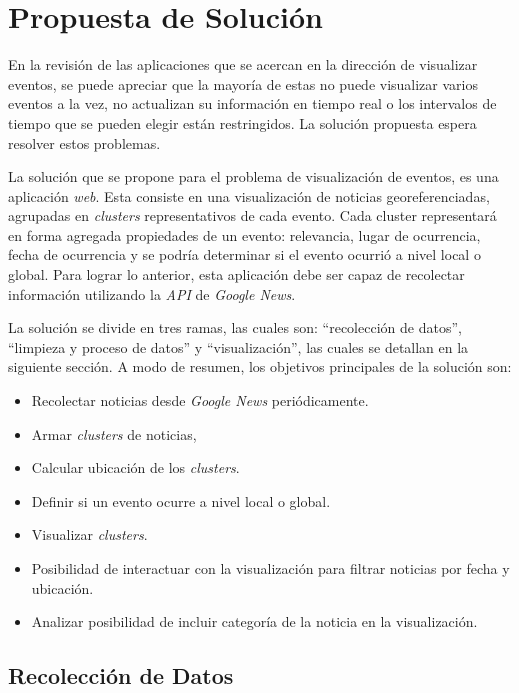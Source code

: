 \documentclass[10pt]{article}
\begin{document}
\section{Propuesta de Solución}

	En la revisión de las aplicaciones que se acercan en la dirección de visualizar eventos, se puede apreciar que la mayoría de estas no puede visualizar varios eventos a la vez, no actualizan su información en tiempo real o los intervalos de tiempo que se pueden elegir están restringidos. La solución propuesta espera resolver estos problemas.

	La solución que se propone para el problema de visualización de eventos, es una aplicación \emph{web}. Esta consiste en una visualización de noticias georeferenciadas, agrupadas en \emph{clusters} representativos de cada evento. Cada cluster representará en forma agregada propiedades de un evento: relevancia, lugar de ocurrencia, fecha de ocurrencia y se podría determinar si el evento ocurrió a nivel local o global. Para lograr lo anterior, esta aplicación debe ser capaz de recolectar información utilizando la \emph{API} de \emph{Google News}.
	
	La solución se divide en tres ramas, las cuales son: ``recolección de datos'', ``limpieza y proceso de datos'' y ``visualización'', las cuales se detallan en la siguiente sección. A modo de resumen, los objetivos principales de la solución son:
	
\begin{itemize}
	\item Recolectar noticias desde \emph{Google News} periódicamente.
	\item Armar \emph{clusters} de noticias,
	\item Calcular ubicación de los \emph{clusters}.
	\item Definir si un evento ocurre a nivel local o global.
	\item Visualizar \emph{clusters}.
	\item Posibilidad de interactuar con la visualización para filtrar noticias por fecha y ubicación.
	\item Analizar posibilidad de incluir categoría de la noticia en la visualización.
\end{itemize}	

\subsection{Recolección de Datos}
\end{document}
